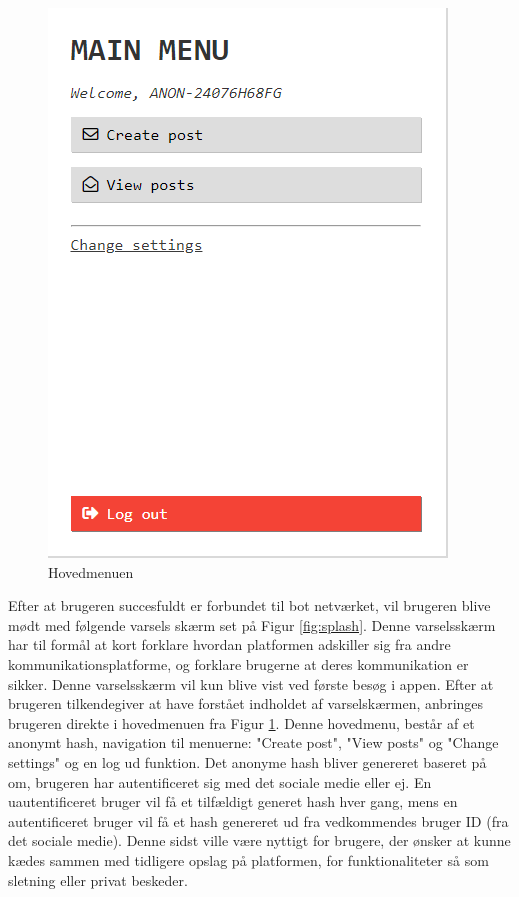 \begin{table}[H]
\begin{minipage}{.5\textwidth}
\begin{figure}[H]
            \includegraphics[width=0.90\linewidth]{Projectdoc/Assets/Illustrationer/main-menu.png}
            \caption{Hovedmenuen}
            \label{fig:mainmenu}
        \end{figure}
    \end{minipage}
\end{table}

Efter at brugeren succesfuldt er forbundet til bot netværket, vil brugeren blive mødt med følgende varsels skærm set på Figur \ref{fig:splash}. Denne varselsskærm har til formål at kort forklare hvordan platformen adskiller sig fra andre kommunikationsplatforme, og forklare brugerne at deres kommunikation er sikker. Denne varselsskærm vil kun blive vist ved første besøg i appen. Efter at brugeren tilkendegiver at have forstået indholdet af varselskærmen, anbringes brugeren direkte i hovedmenuen fra Figur \ref{fig:mainmenu}. Denne hovedmenu, består af et anonymt hash, navigation til menuerne: "Create post", "View posts" og "Change settings" og en log ud funktion. Det anonyme hash bliver genereret baseret på om, brugeren har autentificeret sig med det sociale medie eller ej. En uautentificeret bruger vil få et tilfældigt generet hash hver gang, mens en autentificeret bruger vil få et hash genereret ud fra vedkommendes bruger ID (fra det sociale medie). Denne sidst ville være nyttigt for brugere, der ønsker at kunne kædes sammen med tidligere opslag på platformen, for funktionaliteter så som sletning eller privat beskeder.

